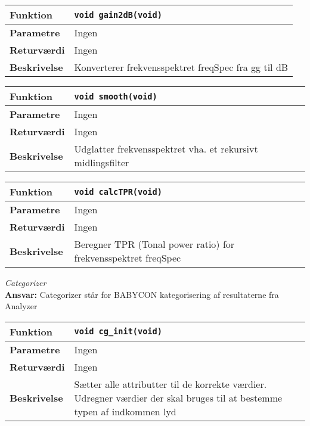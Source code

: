 \begin{center}
    \begin{tabular}{ | l | p{} |}
    \hline
    \textbf{Funktion}	& \verb+void gain2dB(void) +						\\ \hline
    \textbf{Parametre} 	& Ingen		\\ \hline
    \textbf{Returværdi}	& Ingen							\\ \hline
    \textbf{Beskrivelse}& Konverterer frekvensspektret freqSpec fra gg til dB \\ \hline
    \end{tabular}
\end{center}  

\begin{center}
    \begin{tabular}{ | l | p{} |}
    \hline
    \textbf{Funktion}	& \verb+void smooth(void) +						\\ \hline
    \textbf{Parametre} 	& Ingen		\\ \hline
    \textbf{Returværdi}	& Ingen							\\ \hline
    \textbf{Beskrivelse}& Udglatter frekvensspektret vha. et rekursivt midlingsfilter  \\ \hline
    \end{tabular}
\end{center}

\begin{center}
    \begin{tabular}{ | l | p{} |}
    \hline
    \textbf{Funktion}	& \verb+void calcTPR(void) +						\\ \hline
    \textbf{Parametre} 	& Ingen		\\ \hline
    \textbf{Returværdi}	& Ingen							\\ \hline
    \textbf{Beskrivelse}& Beregner TPR (Tonal power ratio) for frekvensspektret freqSpec  \\ \hline
    \end{tabular}
\end{center} 


\textit{Categorizer} \\
\textbf{Ansvar:} Categorizer står for BABYCON kategorisering af resultaterne fra Analyzer

\begin{center}
    \begin{tabular}{ | l | p{} |}
    \hline
    \textbf{Funktion}	& \verb+void cg_init(void)+ \\ \hline
    \textbf{Parametre} 	& Ingen\\ \hline
    \textbf{Returværdi}	& Ingen	 								\\ \hline
    \textbf{Beskrivelse}& Sætter alle attributter til de korrekte værdier. Udregner værdier der skal bruges til at bestemme typen af indkommen lyd	\\ \hline
    \end{tabular}
\end{center}

